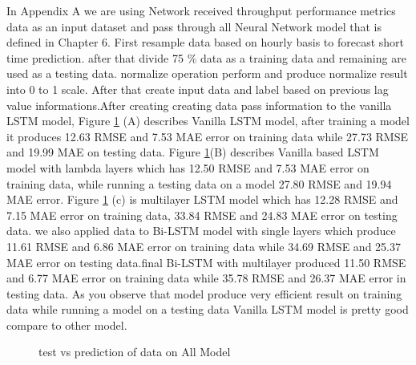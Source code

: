 In Appendix A  we are using Network received throughput performance metrics data as an input dataset and pass through all Neural Network model that is defined in Chapter 6. First resample data based on hourly basis to forecast short time prediction. after that divide 75 \% data as a training data and remaining are used as a testing data. normalize operation perform and produce normalize result into 0 to 1 scale. After that create input data and label based on previous lag value informations.After creating creating data pass information to the vanilla LSTM model, Figure \ref{fig:vanilla12} (A) describes Vanilla LSTM model, after training a  model it produces 12.63 RMSE and 7.53 MAE error on training data while 27.73 RMSE and 19.99 MAE on testing data. Figure \ref{fig:vanilla12}(B) describes Vanilla based LSTM model with lambda layers which has 12.50 RMSE and 7.53 MAE error on training data, while running a testing data on a model 27.80 RMSE and 19.94 MAE error. Figure \ref{fig:vanilla12} (c) is multilayer LSTM model which has 12.28 RMSE and 7.15 MAE error on training data, 33.84 RMSE and 24.83 MAE error on testing data.
we also applied data to Bi-LSTM model with single layers which produce 11.61 RMSE and 6.86 MAE error on training data while 34.69 RMSE and 25.37  MAE error on testing data.final Bi-LSTM with multilayer produced 11.50 RMSE and 6.77 MAE error on training data while 35.78 RMSE and 26.37 MAE error in testing data. As you observe that model produce very efficient result on training data  while running a model on a testing data Vanilla LSTM model is pretty good compare to other model.

\begin{figure}[htp]





\caption{test vs prediction of data on All Model }
\label{fig:vanilla12}
\end{figure}